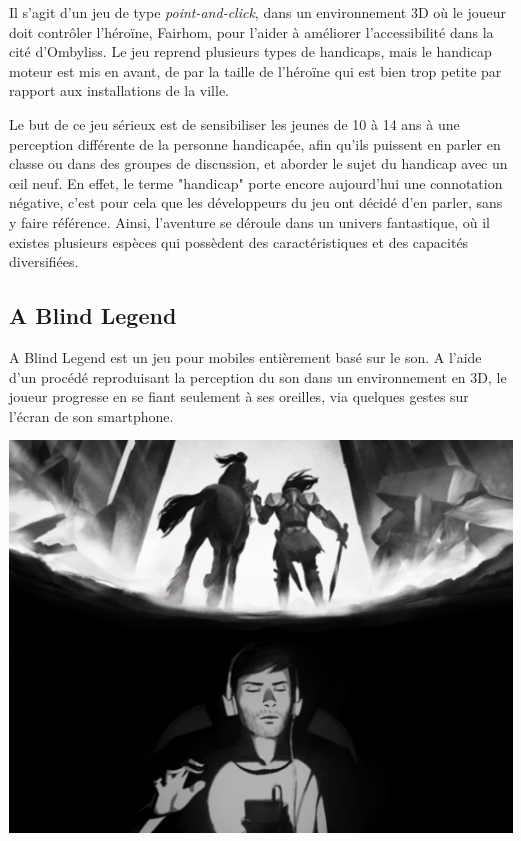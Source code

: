 \documentclass[a4paper,11pt]{article}
\begin{document}
Il s’agit d’un jeu de type \textit{point-and-click}, dans un environnement 3D où le joueur doit contrôler l’héroïne, Fairhom, pour l’aider à améliorer l’accessibilité dans la cité d’Ombyliss. Le jeu reprend plusieurs types de handicaps, mais le handicap moteur est mis en avant, de par la taille de l’héroïne qui est bien trop petite par rapport aux installations de la ville.

Le but de ce jeu sérieux est de sensibiliser les jeunes de 10 à 14 ans à une perception différente de la personne handicapée, afin qu’ils puissent en parler en classe ou dans des groupes de discussion, et aborder le sujet du handicap avec un œil neuf. En effet, le terme "handicap" porte encore aujourd’hui une connotation négative, c’est pour cela que les développeurs du jeu ont décidé d’en parler, sans y faire référence. Ainsi, l’aventure se déroule dans un univers fantastique, où il existes plusieurs espèces qui possèdent des caractéristiques et des capacités diversifiées.

\subsection{A Blind Legend}

A Blind Legend est un jeu pour mobiles entièrement basé sur le son. A l'aide d'un procédé reproduisant la perception du son dans un environnement en 3D, le joueur progresse en se fiant seulement à ses oreilles, via quelques gestes sur l’écran de son smartphone. 

\begin{center}
\includegraphics[scale=0.4]{./fig/jeu2.png}
\end{center}
\end{document}
